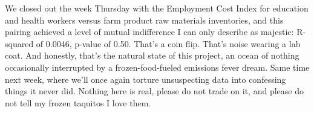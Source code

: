 We closed out the week Thursday with the Employment Cost Index for education and health workers versus farm product raw materials inventories, and this pairing achieved a level of mutual indifference I can only describe as majestic: R-squared of 0.0046, p-value of 0.50. That's a coin flip. That's noise wearing a lab coat. And honestly, that's the natural state of this project, an ocean of nothing occasionally interrupted by a frozen-food-fueled emissions fever dream. Same time next week, where we'll once again torture unsuspecting data into confessing things it never did. Nothing here is real, please do not trade on it, and please do not tell my frozen taquitos I love them.
